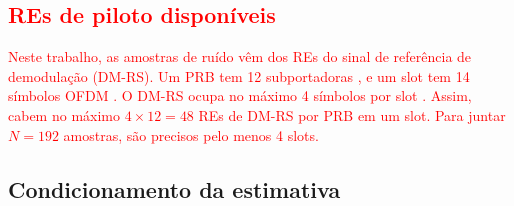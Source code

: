 \subsection{\texorpdfstring{\textcolor{red}{REs de piloto disponíveis}}{REs de piloto disponíveis}}\label{subsec:res-piloto}

\textcolor{red}{Neste trabalho, as amostras de ruído vêm dos REs do sinal de referência de demodulação (DM-RS). Um PRB tem 12 subportadoras \cite[Sec.~4.4.4.1]{3gpp-ts38211}, e um slot tem 14 símbolos OFDM \cite[Tab.~4.3.2-1]{3gpp-ts38211}. O DM-RS ocupa no máximo 4 símbolos por slot \cite[Tab.~6.4.1.1.3-3 e 6.4.1.1.3-4]{3gpp-ts38211}. Assim, cabem no máximo $4 \times 12 = 48$ REs de DM-RS por PRB em um slot. Para juntar $N = 192$ amostras, são precisos pelo menos 4 slots.}


\subsection{Condicionamento da estimativa}\label{subsec:condicionamento-R}



